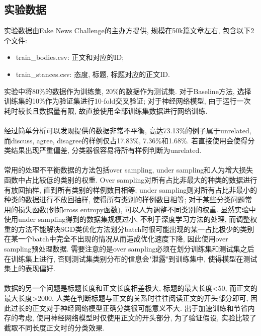 \documentclass[a4paper]{article}
\begin{document}
	\subsection{实验数据}
	实验数据由Fake News Challenge的主办方提供, 规模在50k篇文章左右, 包含以下2个文件:
	\begin{itemize}
		\item train\_bodies.csv: 正文和对应的ID;
		\item train\_stances.csv: 态度, 标题, 标题对应的正文ID.
	\end{itemize}
	实验中将80\%的数据作为训练集, 20\%的数据作为测试集. 对于Baseline方法, 选择训练集的10\%作为验证集进行10-fold交叉验证; 对于神经网络模型, 由于运行一次耗时较长且数据量有限, 故直接使用全部训练集数据进行网络训练.\\\\
	经过简单分析可以发现提供的数据非常不平衡, 高达73.13\%的例子属于unrelated, 而discuss, agree, disagree的样例仅占17.83\%, 7.36\%和1.68\%. 若直接使用会使得分类结果出现严重偏差, 分类器很容易将所有样例判断为unrelated.\\\\
	常用的处理不平衡数据的方法包括over sampling, under sampling和人为增大损失函数中占比较低的类别的权重. Over sampling对所有占比非最大的种类的数据进行有放回抽样, 直到所有类别的样例数目相等; under sampling则对所有占比非最小的种类的数据进行不放回抽样, 使得所有类别的样例数目相等; 对于某些分类问题常用的损失函数(例如cross entropy函数), 可以人为调整不同类别的权重. 显然实验中使用under sampling得到的数据集规模过小, 不利于深度学习方法的处理, 而调整权重的方法不能解决SGD类优化方法划分batch时很可能出现的某一占比极少的类别在某一个batch中完全不出现的情况从而造成优化速度下降, 因此使用over sampling预处理数据. 需要注意的是over sampling必须在划分训练集和测试集之后在训练集上进行, 否则测试集类别分布的信息会"泄露"到训练集中, 使得模型在测试集上的表现偏好.\\\\
	数据的另一个问题是标题长度和正文长度相差极大, 标题的最大长度<50, 而正文的最大长度>2000, 人类在判断标题与正文的关系时往往阅读正文的开头部分即可, 因此过长的正文对于神经网络模型正确分类很可能意义不大. 出于加速训练和节省内存的考虑, 使用神经网络模型时仅使用正文的开头部分, 为了验证假设, 实验比较了截取不同长度正文时的分类效果.
\end{document}
